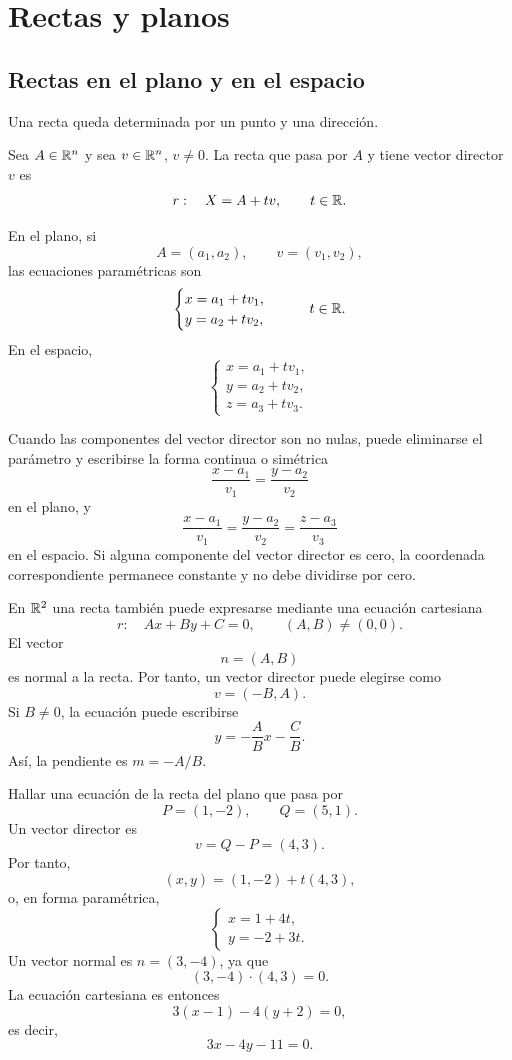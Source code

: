 \section{Rectas y planos}
\label{sec:rectas-planos}

\subsection{Rectas en el plano y en el espacio}

Una recta queda determinada por un punto y una dirección.

\begin{definition}
Sea $A\in\mathbb{R}^n$ y sea $v\in\mathbb{R}^n$, $v\neq0$. La recta que pasa por $A$ y tiene vector director $v$ es
\[
r:\quad X=A+tv,\qquad t\in\mathbb{R}.
\]
\end{definition}

En el plano, si
\[
A=(a_1,a_2),\qquad v=(v_1,v_2),
\]
las ecuaciones paramétricas son
\[
\begin{cases}
x=a_1+tv_1,\\
y=a_2+tv_2,
\end{cases}
\qquad t\in\mathbb{R}.
\]
En el espacio,
\[
\begin{cases}
x=a_1+tv_1,\\
y=a_2+tv_2,\\
z=a_3+tv_3.
\end{cases}
\]

Cuando las componentes del vector director son no nulas, puede eliminarse el parámetro y escribirse la forma continua o simétrica
\[
\frac{x-a_1}{v_1}
=
\frac{y-a_2}{v_2}
\]
en el plano, y
\[
\frac{x-a_1}{v_1}
=
\frac{y-a_2}{v_2}
=
\frac{z-a_3}{v_3}
\]
en el espacio. Si alguna componente del vector director es cero, la coordenada correspondiente permanece constante y no debe dividirse por cero.

En $\mathbb{R}^2$ una recta también puede expresarse mediante una ecuación cartesiana
\[
r:\quad Ax+By+C=0,
\qquad (A,B)\neq(0,0).
\]
El vector
\[
n=(A,B)
\]
es normal a la recta. Por tanto, un vector director puede elegirse como
\[
v=(-B,A).
\]
Si $B\neq0$, la ecuación puede escribirse
\[
y=-\frac ABx-\frac CB.
\]
Así, la pendiente es $m=-A/B$.

\begin{example}
Hallar una ecuación de la recta del plano que pasa por
\[
P=(1,-2),\qquad Q=(5,1).
\]
Un vector director es
\[
v=Q-P=(4,3).
\]
Por tanto,
\[
(x,y)=(1,-2)+t(4,3),
\]
o, en forma paramétrica,
\[
\begin{cases}
x=1+4t,\\
y=-2+3t.
\end{cases}
\]
Un vector normal es $n=(3,-4)$, ya que
\[
(3,-4)\cdot(4,3)=0.
\]
La ecuación cartesiana es entonces
\[
3(x-1)-4(y+2)=0,
\]
es decir,
\[
\boxed{3x-4y-11=0.}
\]
\end{example}

